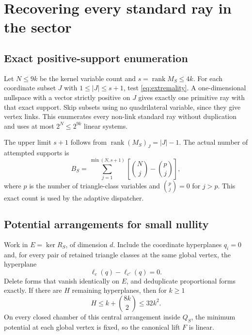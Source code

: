 \documentclass[11pt]{article}
\theoremstyle{definition}
\theoremstyle{remark}
\newcommand{\rank}{\operatorname{rank}}
\begin{document}
\section{Recovering every standard ray in the sector}
\label{sec:standard}

\subsection{Exact positive-support enumeration}

Let $N\le9k$ be the kernel variable count and $s=\rank M_S\le4k$.
For each coordinate subset $J$ with $1\le|J|\le s+1$, test
\eqref{eq:extremality}. A one-dimensional nullspace with a vector strictly
positive on $J$ gives exactly one primitive ray with that exact support.
Skip subsets using no quadrilateral variable, since they give vertex links.
This enumerates every non-link standard ray without duplication and uses at
most $2^N\le2^{9k}$ linear systems.

The upper limit $s+1$ follows from $\rank(M_S)_J=|J|-1$.
The actual number of attempted supports is
\begin{equation}
 B_S=\sum_{j=1}^{\min(N,s+1)}
 \left[\binom Nj-\binom pj\right],
 \label{eq:bs}
\end{equation}
where $p$ is the number of triangle-class variables and $\binom pj=0$ for
$j>p$. This exact count is used by the adaptive dispatcher.

\subsection{Potential arrangements for small nullity}

Work in $E=\ker R_S$, of dimension $d$. Include the coordinate hyperplanes
$q_i=0$ and, for every pair of retained triangle classes at the same global
vertex, the hyperplane
\begin{equation}
 \ell_c(q)-\ell_{c'}(q)=0.
 \label{eq:ties}
\end{equation}
Delete forms that vanish identically on $E$, and deduplicate proportional
forms exactly. If there are $H$ remaining hyperplanes, then for $k\ge1$
\begin{equation}
 H\le k+\binom{8k}{2}\le32k^2.
 \label{eq:hbound}
\end{equation}
On every closed chamber of this central arrangement inside $Q_S$, the minimum
potential at each global vertex is fixed, so the canonical lift $F$ is linear.
\end{document}
